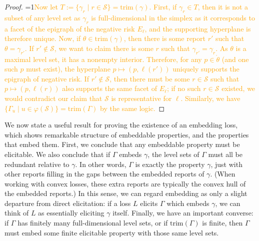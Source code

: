\documentclass[12pt]{article}
\newcommand{\Comments}{1}
\newcommand{\mynote}[2]{\ifnum\Comments=1\textcolor{#1}{#2}\fi}
\newcommand{\proposedadd}[1]{\mynote{orange}{#1}}
\newcommand{\Sc}{\mathcal{S}}
\newcommand{\inter}[1]{\mathring{#1}}%
\newcommand{\trim}{\mathrm{trim}}
\begin{document}
\begin{proof}
  \proposedadd{Now let $T := \{\gamma_r \mid r \in \Sc\} = \trim(\gamma)$. 
    First, if $\gamma_r \in T$, then it is not a subset of any level set as $\gamma_r$ is full-dimensional in the simplex as it corresponds to a facet of the epigraph of the negative risk $E_\ell$, and the supporting hyperplane is therefore unique.
    Now, if $\theta \in \trim(\gamma)$, then there is some report $r'$ such that $\theta = \gamma_{r'}$.
    If $r' \not \in \Sc$, we want to claim there is some $r$ such that $\gamma_{r'} = \gamma_r$.
    As $\theta$ is a maximal level set, it has a nonempty interior.
    Therefore, for any $p \in \inter{\theta}$ (and one such $p$ must exist), the hyperplane $p \mapsto (p, \ell(r'))$ uniquely supports the epigraph of negative risk.
    If $r' \not \in \Sc$, then there must be some $r \in \Sc$ such that $p \mapsto (p, \ell(r))$ also supports the same facet of $E_\ell$; if no such $r \in \Sc$ existed, we would contradict our claim that $\Sc$ is representative for $\ell$.
    Similarly, we have $\{\Gamma_u \mid u \in \varphi(\Sc)\} = \trim(\Gamma)$ by the same logic.}
\end{proof}

We now state a useful result for proving the existence of an embedding loss, which shows remarkable structure of embeddable properties, and the properties that embed them.
First, we conclude that any embeddable property must be elicitable.
We also conclude that if $\Gamma$ embeds $\gamma$, the level sets of $\Gamma$ must all be redundant relative to $\gamma$.
In other words, $\Gamma$ is exactly the property $\gamma$, just with other reports filling in the gaps between the embedded reports of $\gamma$.
(When working with convex losses, these extra reports are typically the convex hull of the embedded reports.)
In this sense, we can regard embedding as only a slight departure from direct elicitation: if a loss $L$ elicits $\Gamma$ which embeds $\gamma$, we can think of $L$ as essentially eliciting $\gamma$ itself.
Finally, we have an important converse: if $\Gamma$ has finitely many full-dimensional level sets, or if $\trim(\Gamma)$ is finite, then $\Gamma$ must embed some finite elicitable property with those same level sets.
\end{document}
